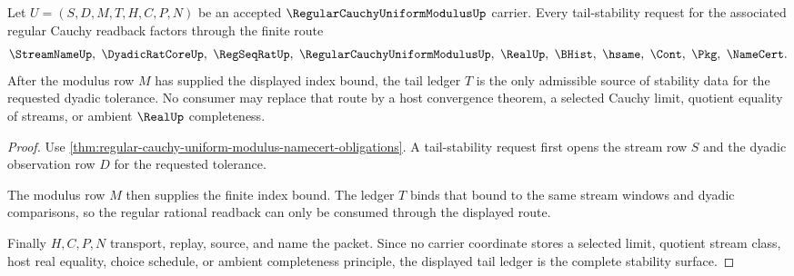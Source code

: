 \begin{theorem}
\label{thm:regular-cauchy-uniform-modulus-tail-stability}
Let $U=(S,D,M,T,H,C,P,N)$ be an accepted
$\RegularCauchyUniformModulusUp$ carrier. Every tail-stability request for the associated regular Cauchy readback factors through the finite route
$$
\StreamNameUp,\ \DyadicRatCoreUp,\ \RegSeqRatUp,\ \RegularCauchyUniformModulusUp,\ \RealUp,\ \BHist,\ \hsame,\ \Cont,\ \Pkg,\ \NameCert .
$$
After the modulus row $M$ has supplied the displayed index bound, the tail ledger $T$ is the only admissible source of stability data for the requested dyadic tolerance. No consumer may replace that route by a host convergence theorem, a selected Cauchy limit, quotient equality of streams, or ambient $\RealUp$ completeness.
\end{theorem}
\begin{proof}
Use \autoref{thm:regular-cauchy-uniform-modulus-namecert-obligations}. A tail-stability request first opens the stream row $S$ and the dyadic observation row $D$ for the requested tolerance.

The modulus row $M$ then supplies the finite index bound. The ledger $T$ binds that bound to the same stream windows and dyadic comparisons, so the regular rational readback can only be consumed through the displayed route.

Finally $H,C,P,N$ transport, replay, source, and name the packet. Since no carrier coordinate stores a selected limit, quotient stream class, host real equality, choice schedule, or ambient completeness principle, the displayed tail ledger is the complete stability surface.
\end{proof}

